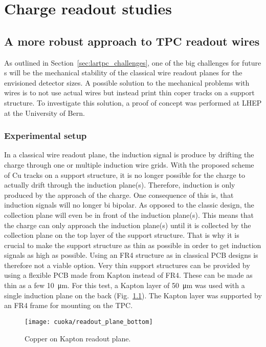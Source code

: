 \chapter{Charge readout studies\label{chap:charge-ro}}


\section{A more robust approach to TPC readout wires\label{sec:charge-ro_cuoka}}

As outlined in Section~\ref{sec:lartpc_challenges}, one of the big challenges for future \lartpc s will be the mechanical stability of the classical wire readout planes for the envisioned detector sizes.
A possible solution to the mechanical problems with wires is to not use actual wires but instead print thin coper tracks on a support structure.
To investigate this solution, a proof of concept was performed at LHEP at the University of Bern.


\subsection*{Experimental setup}

In a classical wire readout plane, the induction signal is produce by drifting the charge through one or multiple induction wire grids.
With the proposed scheme of \si{Cu} tracks on a support structure, it is no longer possible for the charge to actually drift through the induction plane(s).
Therefore, induction is only produced by the approach of the charge.
One consequence of this is, that induction signals will no longer bi bipolar.
As opposed to the classic design, the collection plane will even be in front of the induction plane(s).
This means that the charge can only approach the induction plane(s) until it is collected by the collection plane on the top layer of the support structure.
That is why it is crucial to make the support structure as thin as possible in order to get induction signals as high as possible.
Using an FR4 structure as in classical PCB designs is therefore not a viable option.
Very thin support structures can be provided by using a flexible PCB made from Kapton instead of FR4.
These can be made as thin as a few \SI{10}{\micro\metre}.
For this test, a Kapton layer of \SI{50}{\micro\metre} was used with a single induction plane on the back (Fig.~\ref{fig:cuoka_readout-plane}).
The Kapton layer was supported by an FR4 frame for mounting on the TPC.

\begin{figure}[htb]
	\centering
	\texttt{[image: cuoka/readout\_plane\_bottom]}
	\caption{Copper on Kapton readout plane.}
	\label{fig:cuoka_readout-plane}
\end{figure}

